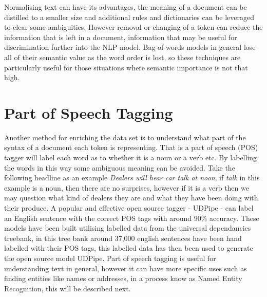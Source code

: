 Normalising text can have its advantages, the meaning of a document can be distilled to a smaller size and additional rules and dictionaries can be leveraged to clear some ambiguities. However  removal or changing of a token can reduce the information that is left in a document, information that may be useful for discrimination further into the NLP model. Bag-of-words models in general lose all of their semantic value as the word order is lost, so these techniques are particularly useful for those situations where semantic importance is not that high.

 \section{Part of Speech Tagging} Another method for enriching the data set is to understand what part of the syntax of a document each token is representing. That is a part of speech (POS) tagger will label each word as to whether it is a noun or a verb etc. By labelling the words in this way some ambiguous meaning can be avoided.  Take the following headline as an example \emph{Dealers will hear car talk at noon}, if \emph{talk} in this example is a noun, then there are no surprises, however if it is a verb then we may question what kind of dealers they are and what they have been doing with their produce. A popular and effective \parencite{zeman-etal-2018-conll} open source tagger - UDPipe \parencite{straka-2018-udpipe} - can label an English sentence with the correct POS tags with around 90\% accuracy. These models have been built utilising labelled data from the universal dependancies treebank, in this tree bank around 37,000 english sentences have been hand labelled with their POS tags, this labelled data has then been used to generate the open source model UDPipe. Part of speech tagging is useful for understanding text in general, however it can have more specific uses such as finding entities like names or addresses, in a process know as Named Entity Recognition, this will be described next.
  
